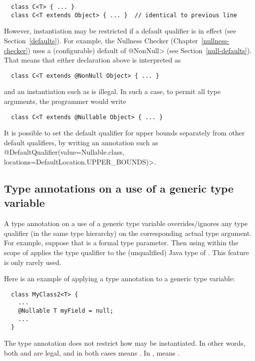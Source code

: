 \begin{Verbatim}
  class C<T> { ... }
  class C<T extends Object> { ... }  // identical to previous line
\end{Verbatim}

\noindent
However, instantiation may be restricted if a default qualifier is in
effect (see Section~\ref{defaults}).  For example, the Nullness Checker
(Chapter~\ref{nullness-checker}) uses a (configurable) default of
\<@NonNull> (see Section~\ref{null-defaults}).  That means that either
declaration above is interpreted as

\begin{Verbatim}
  class C<T extends @NonNull Object> { ... }
\end{Verbatim}

\noindent
and an instantiation such as  is illegal.
In such a case, to permit all type arguments, the programmer would write

\begin{Verbatim}
  class C<T extends @Nullable Object> { ... }
\end{Verbatim}


It is possible to set the default qualifier for upper bounds separately
from other default qualifiers, by writing an annotation such as
\<@DefaultQualifier(value=Nullable.class, locations={DefaultLocation.UPPER\_BOUNDS})>.


\subsection{Type annotations on a use of a generic type variable}

A type annotation on a use of a generic type variable overrides/ignores any type
qualifier (in the same type hierarchy) on the corresponding actual type
argument.  For example, suppose that  is a formal type parameter.
Then using  within the scope of  applies the type
qualifier  to the (unqualified) Java type of \@.
This feature is only rarely used.

Here is an example of applying a type annotation to a generic type
variable:

\begin{Verbatim}
  class MyClass2<T> {
    ...
    @Nullable T myField = null;
    ...
  }
\end{Verbatim}

\noindent
The type annotation does not restrict how  may be
instantiated.  In other words, both
 and  are
legal, and in both cases  means .
In ,
 means .

